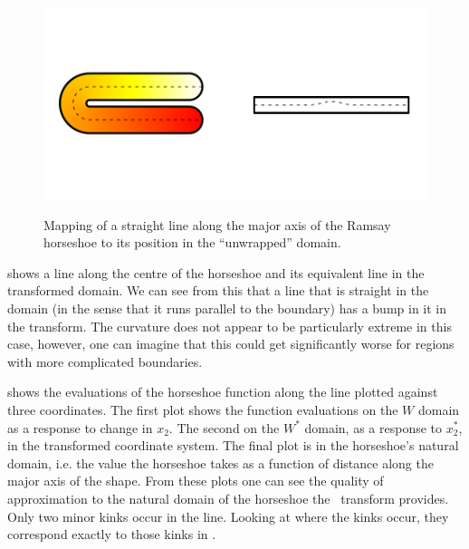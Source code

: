 \begin{figure}
\centering
\includegraphics[trim=0.5in 1in 0in 1in]{sc/figs/horseshoecentreline.pdf} \\
\caption{Mapping of a straight line along the major axis of the Ramsay horseshoe to its position in the ``unwrapped'' domain.}
\label{horseshoecentreline}
\end{figure}

 shows a line along the centre of the horseshoe and its equivalent line in the transformed domain. We can see from this that a line that is straight in the domain (in the sense that it runs parallel to the boundary) has a bump in it in the transform. The curvature does not appear to be particularly extreme in this case, however, one can imagine that this could get significantly worse for regions with more complicated boundaries.

 shows the evaluations of the horseshoe function along the line plotted against three coordinates. The first plot shows the function evaluations on the $W$ domain as a response to change in $x_2$. The second on the $W^*$ domain, as a response to $x_2^*$, in the transformed coordinate system. The final plot is in the horseshoe's natural domain, i.e. the value the horseshoe takes as a function of distance along the major axis of the shape. From these plots one can see the quality of approximation to the natural domain of the horseshoe the \sch\ transform provides. Only two minor kinks occur in the line. Looking at where the kinks occur, they correspond exactly to those kinks in . 

